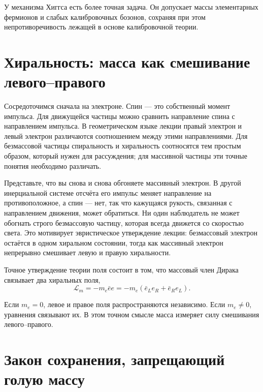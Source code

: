 У механизма Хиггса есть более точная задача. Он допускает массы элементарных фермионов и слабых калибровочных бозонов, сохраняя при этом непротиворечивость лежащей в основе калибровочной теории.

\section{Хиральность: масса как смешивание левого--правого}

Сосредоточимся сначала на электроне. Спин — это собственный момент импульса. Для движущейся частицы можно сравнить направление спина с направлением импульса. В геометрическом языке лекции правый электрон и левый электрон различаются соотношением между этими направлениями. Для безмассовой частицы спиральность и хиральность соотносятся тем простым образом, который нужен для рассуждения; для массивной частицы эти точные понятия необходимо различать.

Представьте, что вы снова и снова обгоняете массивный электрон. В другой инерциальной системе отсчёта его импульс меняет направление на противоположное, а спин — нет, так что кажущаяся рукость, связанная с направлением движения, может обратиться. Ни один наблюдатель не может обогнать строго безмассовую частицу, которая всегда движется со скоростью света. Это мотивирует эвристическое утверждение лекции: безмассовый электрон остаётся в одном хиральном состоянии, тогда как массивный электрон непрерывно смешивает левую и правую хиральности.

Точное утверждение теории поля состоит в том, что массовый член Дирака связывает два хиральных поля,
\begin{equation}
\mathcal L_m
=
-m_e\bar e e
=
-m_e
\left(
  \bar e_L e_R
  +
  \bar e_R e_L
\right).
\end{equation}

Если $m_e=0$, левое и правое поля распространяются независимо. Если $m_e\ne0$, уравнения связывают их. В этом точном смысле масса измеряет силу смешивания левого--правого.

\section{Закон сохранения, запрещающий голую массу}

